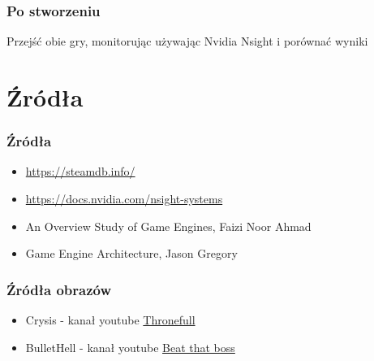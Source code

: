 \documentclass{beamer}
\begin{document}
      \begin{frame} 
        \frametitle{Po stworzeniu}
        Przejść obie gry, monitorując używając Nvidia Nsight i porównać wyniki
      \end{frame}


    \section{Źródła}
\begin{frame}
  \frametitle{Źródła}
    \begin{itemize}
        \item \href{https://steamdb.info/}{https://steamdb.info/}
    \item \href{https://docs.nvidia.com/nsight-systems}{https://docs.nvidia.com/nsight-systems}
    \item An Overview Study of Game Engines, Faizi Noor Ahmad 
    \item Game Engine Architecture, Jason Gregory
    \end{itemize}
    \end{frame}

    \begin{frame}
      \frametitle{Źródła obrazów}
        \begin{itemize}
          \item Crysis - kanał youtube \href{https://www.youtube.com/watch?v=vGjOALIrL_U}{Thronefull}
          \item BulletHell - kanał youtube \href{https://www.youtube.com/watch?app=desktop&v=h-wr6LoETA0}{Beat that boss}
        \end{itemize}
    \end{frame}
\end{document}
